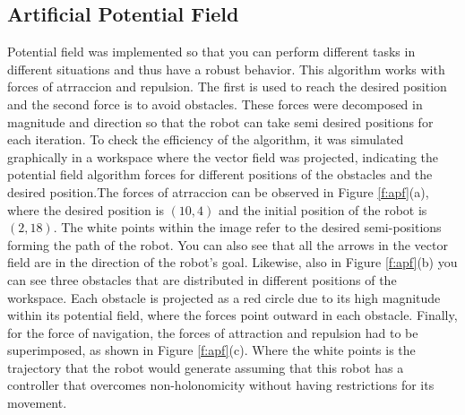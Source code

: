\documentclass[conference]{IEEEtran}
\begin{document}
\subsection{Artificial Potential Field}

Potential field was implemented so that you can perform different tasks in different situations and thus have a robust behavior. This algorithm works with forces of atrraccion and repulsion. The first is used to reach the desired position and the second force is to avoid obstacles. These forces were decomposed in magnitude and direction so that the robot can take semi desired positions for each iteration.
To check the efficiency of the algorithm, it was simulated graphically in a workspace where the vector field was projected, indicating the potential field algorithm forces for different positions of the obstacles and the desired position.The forces of atrraccion can be observed in Figure \ref{f:apf}(a), where the desired position is $ (10,4) $ and the initial position of the robot is $ (2,18) $. The white points within the image refer to the desired semi-positions forming the path of the robot. You can also see that all the arrows in the vector field are in the direction of the robot's goal. Likewise, also in Figure \ref{f:apf}(b) you can see three obstacles that are distributed in different positions of the workspace. Each obstacle is projected as a red circle due to its high magnitude within its potential field, where the forces point outward in each obstacle. Finally, for the force of navigation, the forces of attraction and repulsion had to be superimposed, as shown in Figure \ref{f:apf}(c). Where the white points is the trajectory that the robot would generate assuming that this robot has a controller that overcomes non-holonomicity without having restrictions for its movement.
\end{document}
